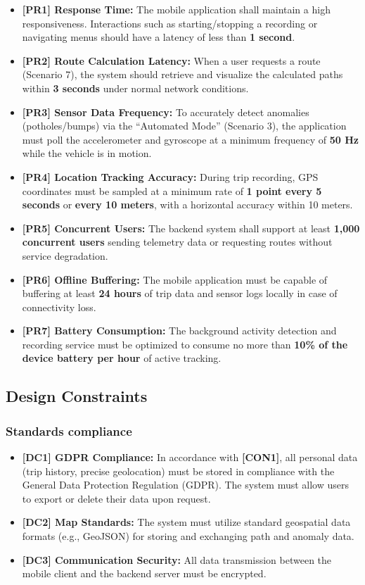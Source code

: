 \begin{itemize}
    \item \textbf{[PR1] Response Time:} The mobile application shall maintain a high responsiveness. Interactions such as starting/stopping a recording or navigating menus should have a latency of less than \textbf{1 second}.
    \item \textbf{[PR2] Route Calculation Latency:} When a user requests a route (Scenario 7), the system should retrieve and visualize the calculated paths within \textbf{3 seconds} under normal network conditions.
    \item \textbf{[PR3] Sensor Data Frequency:} To accurately detect anomalies (potholes/bumps) via the ``Automated Mode'' (Scenario 3), the application must poll the accelerometer and gyroscope at a minimum frequency of \textbf{50 Hz} while the vehicle is in motion.
    \item \textbf{[PR4] Location Tracking Accuracy:} During trip recording, GPS coordinates must be sampled at a minimum rate of \textbf{1 point every 5 seconds} or \textbf{every 10 meters}, with a horizontal accuracy within 10 meters.
    \item \textbf{[PR5] Concurrent Users:} The backend system shall support at least \textbf{1,000 concurrent users} sending telemetry data or requesting routes without service degradation.
    \item \textbf{[PR6] Offline Buffering:} The mobile application must be capable of buffering at least \textbf{24 hours} of trip data and sensor logs locally in case of connectivity loss.
    \item \textbf{[PR7] Battery Consumption:} The background activity detection and recording service must be optimized to consume no more than \textbf{10\% of the device battery per hour} of active tracking.
\end{itemize}

\subsection{Design Constraints}

\subsubsection{Standards compliance}
\begin{itemize}
    \item \textbf{[DC1] GDPR Compliance:} In accordance with \textbf{[CON1]}, all personal data (trip history, precise geolocation) must be stored in compliance with the General Data Protection Regulation (GDPR). The system must allow users to export or delete their data upon request.
    \item \textbf{[DC2] Map Standards:} The system must utilize standard geospatial data formats (e.g., GeoJSON) for storing and exchanging path and anomaly data.
    \item \textbf{[DC3] Communication Security:} All data transmission between the mobile client and the backend server must be encrypted.
\end{itemize}

